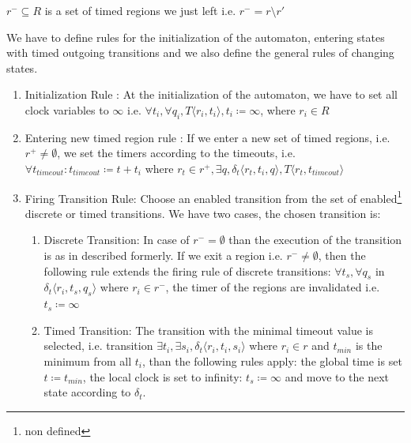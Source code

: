 				$r^- \subseteq R$ is a set of timed regions we just left
				i.e. $r^- = r \setminus r'$
			
				We have to define rules for the initialization of the automaton,
				entering states with timed outgoing transitions 
				and we also define the general rules of changing states. 
				
				\begin{enumerate}
					\item Initialization Rule : At the initialization  of the automaton, we have to set all clock variables to $\infty$ 
					i.e. $\forall t_i, \forall q_i, T \langle r_i, t_i \rangle, t_i \coloneqq \infty $, where $r_i \in R$
				
					\item Entering new timed region rule :
					If we enter a new set of timed regions, 
					i.e. $r^+ \neq \emptyset$, 
					we set the timers according to the timeouts, 
					i.e. $\forall t_{timeout} : t_{timeout} \coloneqq t + t_i $ where $ r_t \in r^+, \exists q ,\delta_t\langle  r_t,t_i,q \rangle, T \langle r_t, t_{timeout} \rangle$
					
					\item Firing Transition Rule: Choose an enabled transition from the set of enabled\footnote{non defined} discrete or timed transitions. 
					We have two cases, the chosen transition is:
						\begin{enumerate}
							\item Discrete Transition: In case of $r^- = \emptyset$ than the execution of the transition is as in described formerly. 
								If we exit a region i.e. $r^- \neq \emptyset$, 
								then the following rule extends the firing rule of discrete transitions:
								$\forall t_s, \forall q_s$ in $ \delta_t \langle r_i, t_s, q_s \rangle$ where $r_i \in r^-$, the timer of the regions are invalidated i.e.
								$t_s \coloneqq \infty$
							\item Timed Transition: The transition with the minimal timeout value is selected, 
								 i.e. transition $\exists t_i, \exists s_i, \delta_t \langle r_i, t_i, s_i \rangle$ where $ r_i \in r$ and $t_{min}$ is the minimum from all $t_i$,
								 than the following rules apply:
								 the global time is set $t \coloneqq t_{min}$, 
								 the local clock is set to infinity: $t_s \coloneqq \infty$ 
								 and move to the next state according to $\delta_t$.
						\end{enumerate}			
				\end{enumerate}



